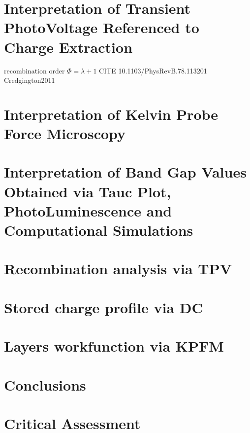 \section{Interpretation of Transient PhotoVoltage Referenced to Charge Extraction}\label{interpretation_tpvce}

	recombination order $\Phi = \lambda + 1$ CITE 10.1103/PhysRevB.78.113201 Credgington2011


\section{Interpretation of Kelvin Probe Force Microscopy}\label{interpretation_kpfm}

\section{Interpretation of Band Gap Values Obtained via Tauc Plot, PhotoLuminescence and Computational Simulations}\label{interpretation_bg}



\section{Recombination analysis via TPV}
\section{Stored charge profile via DC}
\section{Layers workfunction via KPFM}
\section{Conclusions}
\section{Critical Assessment}
